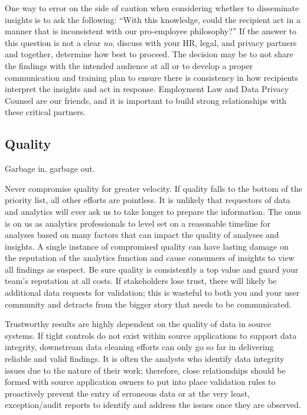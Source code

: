 \documentclass[
]{book}
\begin{document}
One way to error on the side of caution when considering whether to disseminate insights is to ask the following: ``With this knowledge, could the recipient act in a manner that is inconsistent with our pro-employee philosophy?'' If the answer to this question is not a clear \emph{no}, discuss with your HR, legal, and privacy partners and together, determine how best to proceed. The decision may be to not share the findings with the intended audience at all or to develop a proper communication and training plan to ensure there is consistency in how recipients interpret the insights and act in response. Employment Law and Data Privacy Counsel are our friends, and it is important to build strong relationships with these critical partners.

\hypertarget{quality}{%
\subsection{Quality}\label{quality}}

Garbage in, garbage out.

Never compromise quality for greater velocity. If quality falls to the bottom of the priority list, all other efforts are pointless. It is unlikely that requestors of data and analytics will ever ask us to take longer to prepare the information. The onus is on us as analytics professionals to level set on a reasonable timeline for analyses based on many factors that can impact the quality of analyses and insights. A single instance of compromised quality can have lasting damage on the reputation of the analytics function and cause consumers of insights to view all findings as suspect. Be sure quality is consistently a top value and guard your team's reputation at all costs. If stakeholders lose trust, there will likely be additional data requests for validation; this is wasteful to both you and your user community and detracts from the bigger story that needs to be communicated.

Trustworthy results are highly dependent on the quality of data in source systems. If tight controls do not exist within source applications to support data integrity, downstream data cleaning efforts can only go so far in delivering reliable and valid findings. It is often the analysts who identify data integrity issues due to the nature of their work; therefore, close relationships should be formed with source application owners to put into place validation rules to proactively prevent the entry of erroneous data or at the very least, exception/audit reports to identify and address the issues once they are observed.
\end{document}
